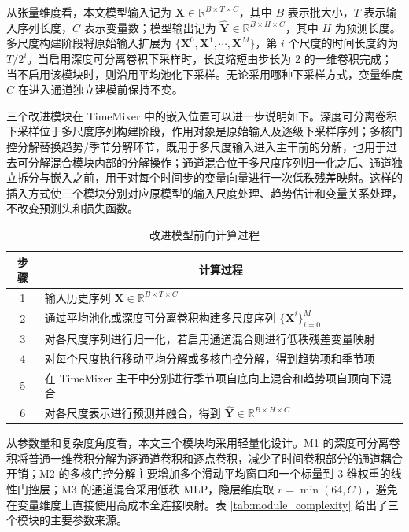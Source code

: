 从张量维度看，本文模型输入记为 $\mathbf{X}\in\mathbb{R}^{B\times T\times C}$，其中 $B$ 表示批大小，$T$ 表示输入序列长度，$C$ 表示变量数；模型输出记为 $\hat{\mathbf{Y}}\in\mathbb{R}^{B\times H\times C}$，其中 $H$ 为预测长度。多尺度构建阶段将原始输入扩展为 $\{\mathbf{X}^{0},\mathbf{X}^{1},\cdots,\mathbf{X}^{M}\}$，第 $i$ 个尺度的时间长度约为 $T/2^i$。当启用深度可分离卷积下采样时，长度缩短由步长为 2 的一维卷积完成；当不启用该模块时，则沿用平均池化下采样。无论采用哪种下采样方式，变量维度 $C$ 在进入通道独立建模前保持不变。

三个改进模块在 TimeMixer 中的嵌入位置可以进一步说明如下。深度可分离卷积下采样位于多尺度序列构建阶段，作用对象是原始输入及逐级下采样序列；多核门控分解替换趋势/季节分解环节，既用于多尺度输入进入主干前的分解，也用于过去可分解混合模块内部的分解操作；通道混合位于多尺度序列归一化之后、通道独立拆分与嵌入之前，用于对每个时间步的变量向量进行一次低秩残差映射。这样的插入方式使三个模块分别对应原模型的输入尺度处理、趋势估计和变量关系处理，不改变预测头和损失函数。

\begin{table}[htbp]
    \centering
    \caption{改进模型前向计算过程}
    \label{tab:forward_process}
    \begin{tabularx}{\textwidth}{@{}cX@{}}
        \toprule
        \multicolumn{1}{c}{步骤} & \multicolumn{1}{c}{计算过程} \\
        \midrule
        1 & 输入历史序列 $\mathbf{X}\in\mathbb{R}^{B\times T\times C}$ \\
        2 & 通过平均池化或深度可分离卷积构建多尺度序列 $\{\mathbf{X}^{i}\}_{i=0}^{M}$ \\
        3 & 对各尺度序列进行归一化，若启用通道混合则进行低秩残差变量映射 \\
        4 & 对每个尺度执行移动平均分解或多核门控分解，得到趋势项和季节项 \\
        5 & 在 TimeMixer 主干中分别进行季节项自底向上混合和趋势项自顶向下混合 \\
        6 & 对各尺度表示进行预测并融合，得到 $\hat{\mathbf{Y}}\in\mathbb{R}^{B\times H\times C}$ \\
        \bottomrule
    \end{tabularx}
\end{table}

从参数量和复杂度角度看，本文三个模块均采用轻量化设计。M1 的深度可分离卷积将普通一维卷积分解为逐通道卷积和逐点卷积，减少了时间卷积部分的通道耦合开销；M2 的多核门控分解主要增加多个滑动平均窗口和一个标量到 3 维权重的线性门控层；M3 的通道混合采用低秩 MLP，隐层维度取 $r=\min(64,C)$，避免在变量维度上直接使用高成本全连接映射。表 \ref{tab:module_complexity} 给出了三个模块的主要参数来源。

